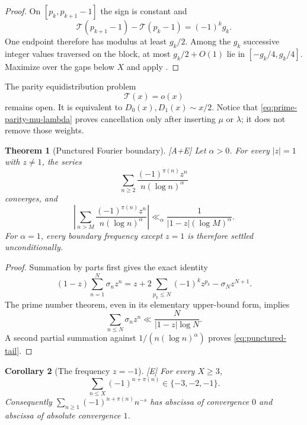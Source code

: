\documentclass[11pt]{article}
\newtheorem{theorem}{Theorem}[section]
\newtheorem{corollary}[theorem]{Corollary}
\theoremstyle{definition}
\theoremstyle{remark}
\newcommand{\status}[1]{\textnormal{\textcolor{accent}{\footnotesize[#1]}}}
\begin{document}
\begin{proof}
On $[p_k,p_{k+1}-1]$ the sign is constant and
\[
 \mathcal T(p_{k+1}-1)-\mathcal T(p_k-1)=(-1)^kg_k.
\]
One endpoint therefore has modulus at least $g_k/2$.  Among the $g_k$ successive
integer values traversed on the block, at most $g_k/2+O(1)$ lie in
$[-g_k/4,g_k/4]$.  Maximize over the gaps below $X$ and apply \cite{FGKMT}.
\end{proof}

The parity equidistribution problem
\begin{equation}\label{eq:global-parity-open}
 \mathcal T(x)=o(x)
\end{equation}
remains open.  It is equivalent to
$D_0(x),D_1(x)\sim x/2$.  Notice that \eqref{eq:prime-parity-mu-lambda} proves
cancellation only after inserting $\mu$ or $\lambda$; it does not remove those weights.

\begin{theorem}[Punctured Fourier boundary]\label{thm:punctured-Erdos}
\status{A+E}
Let $\alpha>0$.  For every $|z|=1$ with $z\ne1$, the series
\begin{equation}\label{eq:punctured-series}
 \sum_{n\ge2}\frac{(-1)^{\pi(n)}z^n}{n(\log n)^\alpha}
\end{equation}
converges, and
\begin{equation}\label{eq:punctured-tail}
 \left|\sum_{n>M}\frac{(-1)^{\pi(n)}z^n}{n(\log n)^\alpha}\right|
 \ll_\alpha\frac1{|1-z|(\log M)^\alpha}.
\end{equation}
For $\alpha=1$, every boundary frequency except $z=1$ is therefore settled
unconditionally.
\end{theorem}

\begin{proof}
Summation by parts first gives the exact identity
\begin{equation}\label{eq:punctured-first-difference}
 (1-z)\sum_{n=1}^N\sigma_nz^n
 =z+2\sum_{p_k\le N}(-1)^kz^{p_k}-\sigma_Nz^{N+1}.
\end{equation}
The prime number theorem, even in its elementary upper-bound form, implies
\[
 \sum_{n\le N}\sigma_nz^n\ll\frac{N}{|1-z|\log N}.
\]
A second partial summation against $1/(n(\log n)^\alpha)$ proves
\eqref{eq:punctured-tail}.
\end{proof}

\begin{corollary}[The frequency $z=-1$]\label{cor:minus-one-parity}
\status{E}
For every $X\ge3$,
\begin{equation}\label{eq:minus-one-bounded-sums}
 \sum_{n\le X}(-1)^{n+\pi(n)}\in\{-3,-2,-1\}.
\end{equation}
Consequently $\sum_{n\ge1}(-1)^{n+\pi(n)}n^{-s}$ has abscissa of convergence $0$
and abscissa of absolute convergence $1$.
\end{corollary}
\end{document}
